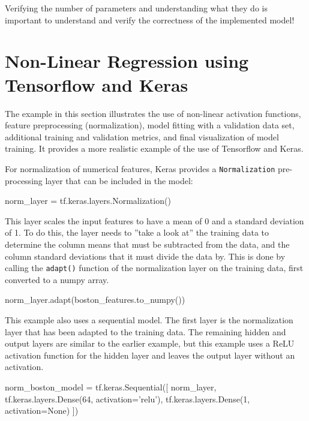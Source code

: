 \begin{alertbox}
Verifying the number of parameters and understanding what they do is important to understand and verify the correctness of the implemented model!
\end{alertbox}

\section{Non-Linear Regression using Tensorflow and Keras}

The example in this section illustrates the use of non-linear activation functions, feature preprocessing (normalization), model fitting with a validation data set, additional training and validation metrics, and final visualization of model training. It provides a more realistic example of the use of Tensorflow and Keras. 

For normalization of numerical features, Keras provides a \texttt{Normalization} pre-processing layer that can be included in the model:

\begin{pythoncode}
norm_layer = tf.keras.layers.Normalization()
\end{pythoncode}

This layer scales the input features to have a mean of 0 and a standard deviation of 1. To do this, the layer needs to ''take a look at'' the training data to determine the column means that must be subtracted from the data, and the column standard deviations that it must divide the data by. This is done by calling the \texttt{adapt()} function of the normalization layer on the training data, first converted to a numpy array.

\begin{pythoncode}
norm_layer.adapt(boston_features.to_numpy())
\end{pythoncode}

This example also uses a sequential model. The first layer is the normalization layer that has been adapted to the training data. The remaining hidden and output layers are similar to the earlier example, but this example uses a ReLU activation function for the hidden layer and leaves the output layer without an activation.

\begin{pythoncode}
norm_boston_model = tf.keras.Sequential([
  norm_layer,
  tf.keras.layers.Dense(64, activation='relu'),
  tf.keras.layers.Dense(1, activation=None)
])
\end{pythoncode}

